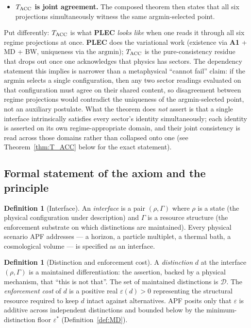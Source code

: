\documentclass[11pt]{article}
\theoremstyle{plain}
\theoremstyle{definition}
\newtheorem{definition}[theorem]{Definition}
\theoremstyle{remark}
\newcommand{\Aone}{\textbf{A1}}
\newcommand{\PLEC}{\textbf{PLEC}}
\begin{document}
\begin{itemize}[leftmargin=2em,itemsep=6pt,topsep=4pt]
  \item \textbf{$T_{\rm ACC}$ is joint agreement.}  The composed theorem then states that all six projections simultaneously witness the same argmin-selected point.
\end{itemize}

Put differently: $T_{\rm ACC}$ is what \PLEC{} \emph{looks like} when one reads it through all six regime projections at once.  \PLEC{} does the variational work (existence via \Aone{} + MD + BW, uniqueness via the $\mathrm{argmin}$); $T_{\rm ACC}$ is the pure-consistency residue that drops out once one acknowledges that physics has sectors.  The dependency statement this implies is narrower than a metaphysical ``cannot fail'' claim: if the $\mathrm{argmin}$ selects a single configuration, then any two sector readings evaluated on that configuration must agree on their shared content, so disagreement between regime projections would contradict the uniqueness of the argmin-selected point, not an auxiliary postulate.  What the theorem does \emph{not} assert is that a single interface intrinsically satisfies every sector's identity simultaneously; each identity is asserted on its own regime-appropriate domain, and their joint consistency is read across those domains rather than collapsed onto one (see Theorem~\ref{thm:T_ACC} below for the exact statement).

\bigskip

\subsection{Formal statement of the axiom and the principle}\label{supp:A2}

\begin{definition}[Interface]\label{def:interface}
An \emph{interface} is a pair $(\rho, \Gamma)$ where $\rho$ is a state (the physical configuration under description) and $\Gamma$ is a resource structure (the enforcement substrate on which distinctions are maintained).  Every physical scenario APF addresses --- a horizon, a particle multiplet, a thermal bath, a cosmological volume --- is specified as an interface.
\end{definition}

\begin{definition}[Distinction and enforcement cost]\label{def:distinction}
A \emph{distinction} $d$ at the interface $(\rho, \Gamma)$ is a maintained differentiation: the assertion, backed by a physical mechanism, that ``this is not that''.  The set of maintained distinctions is $\mathcal{D}$.  The \emph{enforcement cost} of $d$ is a positive real $\varepsilon(d) > 0$ representing the structural resource required to keep $d$ intact against alternatives.  APF posits only that $\varepsilon$ is additive across independent distinctions and bounded below by the minimum-distinction floor $\varepsilon^*$ (Definition~\ref{def:MD}).
\end{definition}
\end{document}

